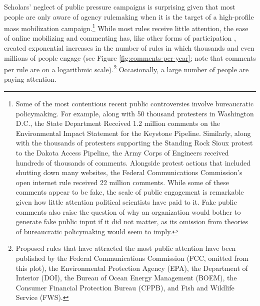 \documentclass[
      12pt,
        ]{article}
\begin{document}
Scholars' neglect of public pressure campaigns is surprising given that most people are only
aware of agency rulemaking when it is the target of a high-profile mass
mobilization campaign.\footnote{Some of the most contentious recent public controversies involve
  bureaucratic policymaking. For example, along with 50 thousand
  protesters in Washington D.C., the State Department Received 1.2
  million comments on the Environmental Impact Statement for the
  Keystone Pipeline. Similarly, along with the thousands of protesters
  supporting the Standing Rock Sioux protest to the Dakota Access
  Pipeline, the Army Corps of Engineers received hundreds of thousands
  of comments. Alongside protest actions that included shutting down
  many websites, the Federal Communications Commission's open internet
  rule received 22 million comments. While some of these comments
  appear to be fake, the scale of public engagement is remarkable
  given how little attention political scientists have paid to it.
  Fake public comments also raise the question of why an organization
  would bother to generate fake public input if it did not matter, as
  its omission from theories of bureaucratic policymaking would seem
  to imply.} While most rules receive little attention,
the ease of online mobilizing and commenting has, like other forms of
participation \citep{Boulianne2018}, created exponential increases in the
number of rules in which thousands and even millions of people engage
(see Figure \ref{fig:comments-per-year}; note that comments per rule are on a
logarithmic scale).\footnote{Proposed rules that have attracted the most public attention have
  been published by the Federal Communications Commission (FCC,
  omitted from this plot), the Environmental Protection Agency (EPA),
  the Department of Interior (DOI), the Bureau of Ocean Energy
  Management (BOEM), the Consumer Financial Protection Bureau (CFPB),
  and Fish and Wildlife Service (FWS).} Occasionally, a large number of people are
paying attention.
\end{document}
